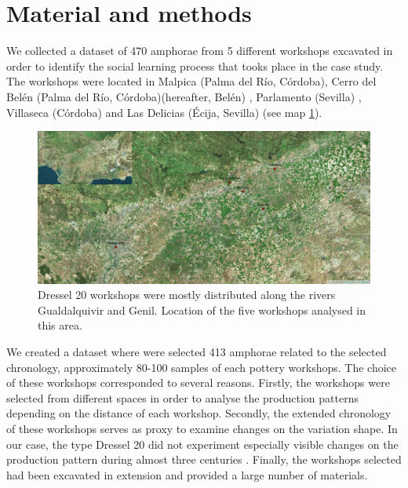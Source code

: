 \documentclass[review]{elsarticle}
\begin{document}
\section{Material and methods}

We collected a dataset of 470 amphorae from 5 different workshops excavated in order to identify the social learning process that tooks place in the case study. The workshops were located in Malpica (Palma del R\'io, C\'ordoba), Cerro del Bel\'en (Palma del R\'io, C\'ordoba)(hereafter, Bel\'en) \citep{diaz_trujillo_excavacion_1992}, Parlamento (Sevilla) \citep{garcia_vargas_anforas_2000}, Villaseca (C\'ordoba)\citep{garcia_vargas_enrique_excavacion_????} and Las Delicias (\'Ecija, Sevilla) \citep{fernandez_excavacion_2001,_atelier_2014} (see map \ref{romanworkshop}).

\begin{figure}[htp]
	\centering
\includegraphics[scale=0.30]{romanworkshop.png}
\caption{Dressel 20 workshops were mostly distributed along the rivers Gualdalquivir and Genil. Location of the five workshops analysed in this area.}
\label{romanworkshop}
\end{figure} 

We created a dataset where were selected 413 amphorae related to the selected chronology, approximately 80-100 samples of each pottery workshops. The choice of these workshops corresponded to several reasons. Firstly, the workshops were selected from different spaces in order to analyse the production patterns depending on the distance of each workshop. Secondly, the extended chronology of these workshops serves as proxy to examine changes on the variation shape. In our case, the type Dressel 20 did not experiment especially visible changes on the production pattern during almost three centuries \citep{berni_dressel_2016}. Finally, the workshops selected had been excavated in extension and provided a large number of materials.   
\end{document}
